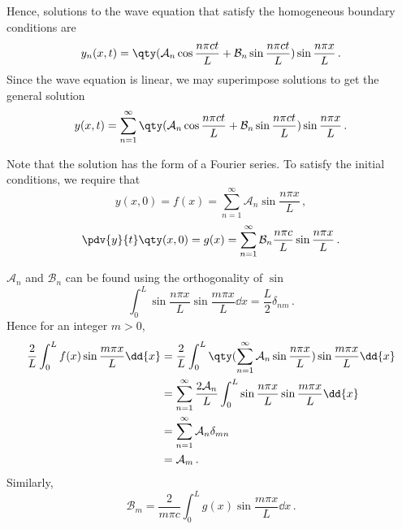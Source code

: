 \documentclass{article}
\theoremstyle{plain}\theoremheaderfont{\normalfont\itshape}\theorembodyfont{\rmfamily}\theoremseparator{.}\newtheorem*{rem}{Remark}\newtheorem*{ex}{Example}\newtheorem*{proof}{Proof}\newtheorem*{altp}{Alternative proof}
\theoremstyle{plain}\theoremheaderfont{\normalfont\bfseries}\theorembodyfont{\rmfamily}\theoremseparator{.}\newtheorem{thm}{Theorem}[section]\newtheorem{lem}[thm]{Lemma}\newtheorem{prop}[thm]{Proposition}\newtheorem*{cor}{Corollary}\newtheorem{defn}[thm]{Definition}\newtheorem{clm}[thm]{Claim}\newtheorem{clminproof}{Claim}
\theoremstyle{break}\theoremheaderfont{\normalfont\itshape}\theorembodyfont{\rmfamily}\theoremseparator{.\medskip}\newtheorem*{proofskip}{Proof}\newtheorem*{exs}{Examples}\newtheorem*{rems}{Remarks}
\theoremstyle{break}\theoremheaderfont{\normalfont\bfseries}\theorembodyfont{\rmfamily}\theoremseparator{.\medskip}\newtheorem{lemskip}[thm]{Lemma}\newtheorem{defnskip}[thm]{Definition}\newtheorem{propskip}[thm]{Proposition}\newtheorem{thmskip}[thm]{Theorem}
\numberwithin{equation}{section}
\begin{document}
	Hence, solutions to the wave equation that satisfy the homogeneous boundary conditions are
	\[y_n(x,t)=\qty(\mathcal{A}_n\cos\frac{n\pi ct}{L}+\mathcal{B}_n\sin\frac{n\pi ct}{L})\sin\frac{n\pi x}{L}\,.\]
	Since the wave equation is linear, we may superimpose solutions to get the general solution
	\[y(x,t)=\sum_{n=1}^{\infty}\qty(\mathcal{A}_n\cos\frac{n\pi ct}{L}+\mathcal{B}_n\sin\frac{n\pi ct}{L})\sin\frac{n\pi x}{L}\,.\]
	
	Note that the solution has the form of a Fourier series. To satisfy the initial conditions, we require that
	\[y(x,0)=f(x)=\sum_{n=1}^{\infty}\mathcal{A}_n\sin\frac{n\pi x}{L}\,,\]
	\[\pdv{y}{t} \qty(x,0)=g(x)=\sum_{n=1}^{\infty}\mathcal{B}_n\frac{n\pi c}{L}\sin\frac{n\pi x}{L}\,.\]
	
	\(\mathcal{A}_n\) and \(\mathcal{B}_n\) can be found using the orthogonality of \(\sin\)
	\[\int_{0}^{L}\sin\frac{n\pi x}{L}\sin\frac{m\pi x}{L}\dd{x}=\frac{L}{2}\delta_{nm}\,.\]
	Hence for an integer \(m>0\),
	\begin{align*}
		\frac{2}{L}\int_{0}^{L}f(x)\sin\frac{m\pi x}{L}\dd{x}&=\frac{2}{L}\int_{0}^{L}\qty(\sum_{n=1}^{\infty}\mathcal{A}_n\sin\frac{n\pi x}{L})\sin\frac{m\pi x}{L}\dd{x}\\
		&=\sum_{n=1}^{\infty}\frac{2\mathcal{A}_n}{L}\int_{0}^{L}\sin\frac{n\pi x}{L}\sin\frac{m\pi x}{L}\dd{x}\\
		&=\sum_{n=1}^{\infty}\mathcal{A}_n\delta_{mn}\\
		&=\mathcal{A}_m\,.
	\end{align*}
	Similarly,
	\[\mathcal{B}_m=\frac{2}{m\pi c}\int_{0}^{L}g(x)\sin\frac{m\pi x}{L}\dd{x}\,.\]
\end{document}
